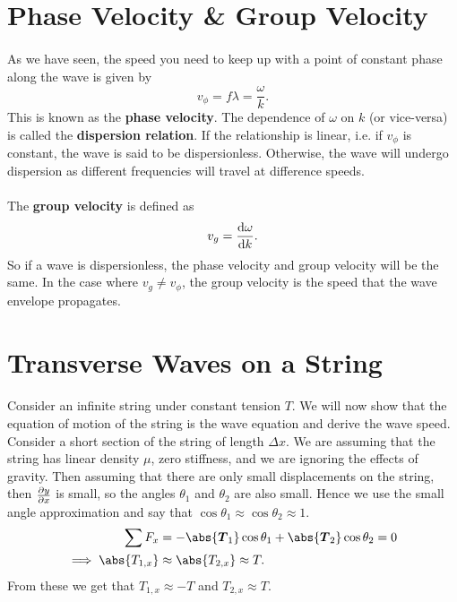 \documentclass[../classical_mechanics.tex]{subfiles}
\begin{document}
    \section{Phase Velocity \& Group Velocity}\label{sec:phase-velocity-and-group-velocity}
        \paragraph{}
        As we have seen, the speed you need to keep up with a point of constant phase along the wave is given by
        \begin{equation}
            v_\phi=f\lambda=\frac{\omega}{k}.
        \end{equation}
        This is known as the \textbf{phase velocity}.
        The dependence of $\omega$ on $k$ (or vice-versa) is called the \textbf{dispersion relation}.
        If the relationship is linear, i.e. if $v_\phi$ is constant, the wave is said to be dispersionless.
        Otherwise, the wave will undergo dispersion as different frequencies will travel at difference speeds.

        \paragraph{}
        The \textbf{group velocity} is defined as
        \begin{equation}
            v_g=\dv{\omega}{k}.
        \end{equation}
        So if a wave is dispersionless, the phase velocity and group velocity will be the same.
        In the case where $v_g\neq v_\phi$, the group velocity is the speed that the wave envelope propagates.

    \section{Transverse Waves on a String}\label{sec:transverse-waves-on-a-string}
        \paragraph{}
        Consider an infinite string under constant tension $T$.
        We will now show that the equation of motion of the string is the wave equation and derive the wave speed.
        Consider a short section of the string of length $\Delta x$.
        We are assuming that the string has linear density $\mu$, zero stiffness, and we are ignoring the effects of gravity.
        Then assuming that there are only small displacements on the string, then $\pdv{y}{x}$ is small, so the angles $\theta_1$ and $\theta_2$ are also small.
        Hence we use the small angle approximation and say that $\cos\theta_1\approx\cos\theta_2\approx 1$.
        \begin{align}
            \sum F_x&=-\abs{\vec{T}_1}\cos\theta_1+\abs{\vec{T}_2}\cos\theta_2=0\\
            \implies\abs{T_{1,x}}&\approx\abs{T_{2,x}}\approx T.
        \end{align}
        From these we get that $T_{1,x}\approx -T$ and $T_{2,x}\approx T$.
        
\end{document}
